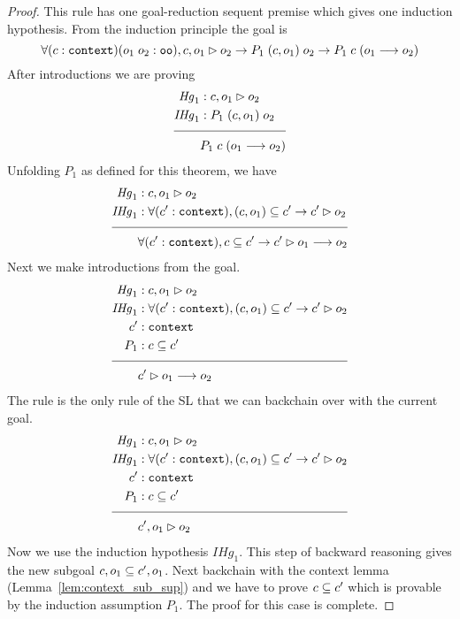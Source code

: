 \begin{proof}
This rule has one goal-reduction sequent premise which gives one induction hypothesis. From the induction principle the goal is
$$
\forall (c : \sltm{context}) (o_1 \; o_2 : \sltm{oo}), \seqsl[c,o_1]{o_2} \rightarrow P_1 \; (c,o_1) \; o_2 \rightarrow P_1 \; c \; (o_1 \longrightarrow o_2)
$$
After introductions we are proving
\begin{align*}
\mathit{Hg}_1 &: \seqsl[c,o_1]{o_2} \\
\mathit{IHg}_1 &: P_1 \; (c,o_1) \; o_2 \\[\pfshift{}]
\cline{1-2}
& P_1 \; c \; (o_1 \longrightarrow o_2)
\end{align*}
Unfolding $P_1$ as defined for this theorem, we have
\begin{align*}
\mathit{Hg}_1 &: \seqsl[c,o_1]{o_2} \\
\mathit{IHg}_1 &: \forall (\inddyncon{} : \sltm{context}), (c,o_1) \subseteq \inddyncon{} \rightarrow \seqsl[\inddyncon{}]{o_2} \\[\pfshift{}]
\cline{1-2}
& \forall (\inddyncon{} : \sltm{context}), c \subseteq \inddyncon{} \rightarrow \seqsl[\inddyncon{}]{o_1 \longrightarrow o_2}
\end{align*}
Next we make introductions from the goal.
\begin{align*}
\mathit{Hg}_1 &: \seqsl[c,o_1]{o_2} \\
\mathit{IHg}_1 &: \forall (\inddyncon{} : \sltm{context}), (c,o_1) \subseteq \inddyncon{} \rightarrow \seqsl[\inddyncon{}]{o_2} \\
\inddyncon{} &: \sltm{context} \\
P_1 &: c \subseteq \inddyncon{} \\[\pfshift{}]
\cline{1-2}
& \seqsl[\inddyncon{}]{o_1 \longrightarrow o_2}
\end{align*}
The rule \rlnmsimp{} is the only rule of the SL that we can backchain over with the current goal.
\begin{align*}
\mathit{Hg}_1 &: \seqsl[c,o_1]{o_2} \\
\mathit{IHg}_1 &: \forall (\inddyncon{} : \sltm{context}), (c,o_1) \subseteq \inddyncon{} \rightarrow \seqsl[\inddyncon{}]{o_2} \\
\inddyncon{} &: \sltm{context} \\
P_1 &: c \subseteq \inddyncon{} \\[\pfshift{}]
\cline{1-2}
& \seqsl[\inddyncon{} , o_1]{o_2}
\end{align*}
Now we use the induction hypothesis $\mathit{IHg}_1$. This step of backward reasoning gives the new subgoal $c , o_1 \subseteq \inddyncon{} , o_1$. Next backchain with the context lemma  (Lemma~\ref{lem:context_sub_sup}) and we have to prove $c \subseteq \inddyncon{}$ which is provable by the induction assumption $P_1$. The proof for this case is complete.


\end{proof}
